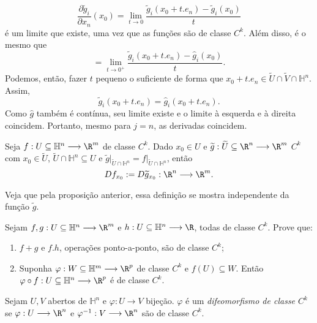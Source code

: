 \begin{demo}
\[    \frac{\partial \widetilde{g}_i}{\partial x_n} \left( x_0 \right) = \lim_{t \to 0} \frac{\widetilde{g}_i\left( x_0+t.e_n \right) -\widetilde{g}_i\left(  x_0\right) }{t}
\] é um limite que existe, uma vez que as funções são de classe $C^{k}$. Além disso, é o mesmo que \[
= \lim_{t \to 0^{+}} \frac{\widetilde{g}_i\left( x_0+t.e_n \right) -\hat{g}_i\left(  x_0\right) }{t}
.\] Podemos, então, fazer $t$ pequeno o suficiente de forma que $x_0+t.e_n\in \widetilde{U}\cap \widetilde{V}\cap \mathbb{H}^{n}$. Assim, \[
\widetilde{g}_i\left( x_0+t.e_n \right) = \hat{g}_i\left( x_0+t.e_n \right)
.\] Como $\hat{g}$ também é contínua, seu limite existe e o limite à esquerda e à direita coincidem. Portanto, mesmo para $j=n$, as derivadas coincidem.
\end{demo}

\begin{definition}
    Seja $f: U\subseteq\mathbb{H}^{n} \longrightarrow \R^{m}$ de classe $C^{k}$. Dado $x_0\in U$ e $\widetilde{g}: \widetilde{U}\subseteq\R^{n} \longrightarrow \R^{m}$ $C^{k}$ com $x_0\in \widetilde{U}$, $\widetilde{U}\cap \mathbb{H}^{n} \subseteq U$ e $\widetilde{g}\Big|_{\widetilde{U}\cap \mathbb{H}^{n}} = f\Big|_{\widetilde{U}\cap \mathbb{H}^{n}}$, então \[
    Df_{x_0} := D\widetilde{g}_{x_0} : \R^{n} \longrightarrow \R^{m}
    .\] 
\end{definition}

Veja que pela proposição anterior, essa definição se mostra independente da função $\widetilde{g}$.

\begin{problem}
    Sejam $f, g: U\subseteq\mathbb{H}^{n} \longrightarrow \R^{m}$ e $h: U\subseteq \mathbb{H}^{n} \longrightarrow \R$, todas de classe $C^{k}$. Prove que:
    \begin{enumerate}
        \item $f+g$ e $f . h$, operações ponto-a-ponto, são de classe $C^{k}$;
	\item Suponha $\varphi : W\subseteq\mathbb{H}^{m} \longrightarrow \R^{p}$ de classe $C^{k}$ e $f\left( U \right) \subseteq W$. Então $\varphi \circ f: U\subseteq\mathbb{H}^{n} \longrightarrow \R^{p}$ é de classe $C^{k}$.
    \end{enumerate}
\end{problem}

\begin{definition}
    Sejam $U,V$ abertos de $\mathbb{H}^{n}$ e $\varphi : U \longrightarrow V$ bijeção. $\varphi $ é um \emph{difeomorfismo de classe $C^{k}$} se $\varphi : U \longrightarrow \R^{n}$ e $\varphi ^{-1}: V  \longrightarrow \R^{n}$ são de classe $C^{k}$.
\end{definition}

